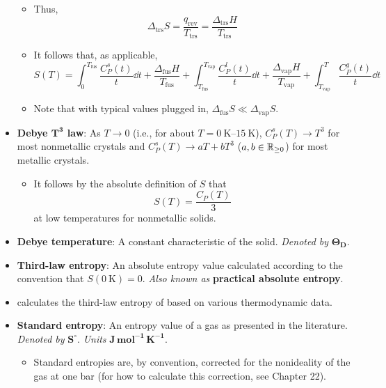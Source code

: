 \documentclass[../notes.tex]{subfiles}
\begin{document}
\begin{itemize}
\begin{itemize}
        \item Thus,
        \begin{equation*}
            \Delta_\text{trs}S = \frac{q_\text{rev}}{T_\text{trs}}
            = \frac{\Delta_\text{trs}H}{T_\text{trs}}
        \end{equation*}
        \item It follows that, as applicable,
        \begin{equation*}
            S(T) = \int_0^{T_\text{fus}}\frac{C_P^s(t)}{t}\dd{t}+\frac{\Delta_\text{fus}H}{T_\text{fus}}+\int_{T_\text{fus}}^{T_\text{vap}}\frac{C_P^l(t)}{t}\dd{t}+\frac{\Delta_\text{vap}H}{T_\text{vap}}+\int_{T_\text{vap}}^T\frac{C_P^g(t)}{t}\dd{t}
        \end{equation*}
        \item Note that with typical values plugged in, $\Delta_\text{fus}S\ll\Delta_\text{vap}S$.
    \end{itemize}
    \item \textbf{Debye $\bm{T^3}$ law}: As $T\to 0$ (i.e., for about $T=\SIrange{0}{15}{\kelvin}$), $C_P^s(T)\to T^3$ for most nonmetallic crystals and $C_P^s(T)\to aT+bT^3$ ($a,b\in\mathbb{R}_{\geq 0}$) for most metallic crystals.
    \begin{itemize}
        \item It follows by the absolute definition of $S$ that
        \begin{equation*}
            S(T) = \frac{C_P(T)}{3}
        \end{equation*}
        at low temperatures for nonmetallic solids.
    \end{itemize}
    \item \textbf{Debye temperature}: A constant characteristic of the solid. \emph{Denoted by} $\bm{\Theta_\textbf{D}}$.
    \item \textbf{Third-law entropy}: An absolute entropy value calculated according to the convention that $S(\SI{0}{\kelvin})=0$. \emph{Also known as} \textbf{practical absolute entropy}.
    \item \textcite{bib:McQuarrieSimon} calculates the third-law entropy of  based on various thermodynamic data.
    \item \textbf{Standard entropy}: An entropy value of a gas as presented in the literature. \emph{Denoted by} $\bm{S^\circ}$. \emph{Units} $\bm{\textbf{J}\,\textbf{mol}^{-1}\,\textbf{K}^{-1}}$.
    \begin{itemize}
        \item Standard entropies are, by convention, corrected for the nonideality of the gas at one bar (for how to calculate this correction, see Chapter 22).

\end{itemize}
\end{itemize}
\end{document}
